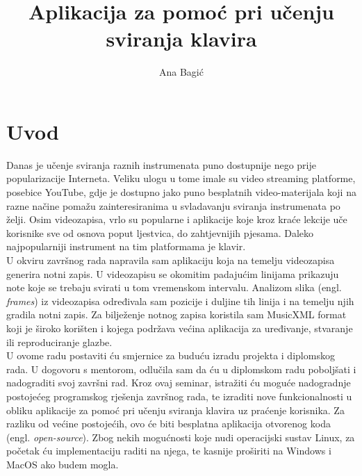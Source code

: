 \documentclass[times, utf8, seminar]{fer}
\begin{document}
\title{Aplikacija za pomoć pri učenju sviranja klavira}

\author{Ana Bagić}


\maketitle

\tableofcontents

\chapter{Uvod}
Danas je učenje sviranja raznih instrumenata puno dostupnije nego prije popularizacije Interneta. Veliku ulogu u tome imale su video streaming platforme, posebice YouTube, gdje je dostupno jako puno besplatnih video-materijala koji na razne načine pomažu zainteresiranima u svladavanju sviranja instrumenata po želji. Osim videozapisa, vrlo su popularne i aplikacije koje kroz kraće lekcije uče korisnike sve od osnova poput ljestvica, do zahtjevnijih pjesama. Daleko najpopularniji instrument na tim platformama je klavir.\\

U okviru završnog rada napravila sam aplikaciju koja na temelju videozapisa generira notni zapis. U videozapisu se okomitim padajućim linijama prikazuju note koje se trebaju svirati u tom vremenskom intervalu. Analizom slika (engl. \textit{frames}) iz videozapisa određivala sam pozicije i duljine tih linija i na temelju njih gradila notni zapis. Za bilježenje notnog zapisa koristila sam MusicXML format koji je široko korišten i kojega podržava većina aplikacija za uređivanje, stvaranje ili reproduciranje glazbe.\\

U ovome radu postaviti ću smjernice za buduću izradu projekta i diplomskog rada. U dogovoru s mentorom, odlučila sam da ću u diplomskom radu poboljšati i nadograditi svoj završni rad. Kroz ovaj seminar, istražiti ću moguće nadogradnje postojećeg programskog rješenja završnog rada, te izraditi nove funkcionalnosti u obliku aplikacije za pomoć pri učenju sviranja klavira uz praćenje korisnika. Za razliku od većine postojećih, ovo će biti besplatna aplikacija otvorenog koda (engl. \textit{open-source}). Zbog nekih mogućnosti koje nudi operacijski sustav Linux, za početak ću implementaciju raditi na njega, te kasnije proširiti na Windows i MacOS ako budem mogla.
\end{document}
